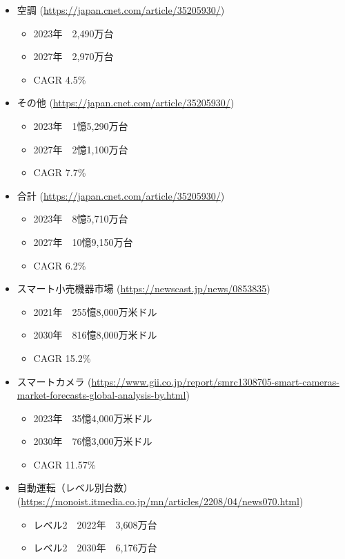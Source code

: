 \begin{itemize}
\begin{itemize}
\begin{itemize}
\begin{itemize}
			\end{itemize}
			\item 空調 (\url{https://japan.cnet.com/article/35205930/})
			\begin{itemize}
				\item 2023年　2,490万台
				\item 2027年　2,970万台
				\item CAGR 4.5\%
			\end{itemize}
			\item その他 (\url{https://japan.cnet.com/article/35205930/})
			\begin{itemize}
				\item 2023年　1憶5,290万台
				\item 2027年　2憶1,100万台
				\item CAGR 7.7\%
			\end{itemize}
			\item 合計 (\url{https://japan.cnet.com/article/35205930/})
			\begin{itemize}
				\item 2023年　8憶5,710万台
				\item 2027年　10憶9,150万台
				\item CAGR 6.2\%
			\end{itemize}
			\item スマート小売機器市場 (\url{https://newscast.jp/news/0853835})
			\begin{itemize}
				\item 2021年　255憶8,000万米ドル
				\item 2030年　816憶8,000万米ドル
				\item CAGR 15.2\%
			\end{itemize}
			\item スマートカメラ (\url{https://www.gii.co.jp/report/smrc1308705-smart-cameras-market-forecasts-global-analysis-by.html})
			\begin{itemize}
				\item 2023年　35憶4,000万米ドル
				\item 2030年　76憶3,000万米ドル
				\item CAGR 11.57\%
			\end{itemize}
			\item 自動運転（レベル別台数） (\url{https://monoist.itmedia.co.jp/mn/articles/2208/04/news070.html})
			\begin{itemize}
				\item レベル2　2022年　3,608万台
				\item レベル2　2030年　6,176万台

\end{itemize}
\end{itemize}
\end{itemize}
\end{itemize}
